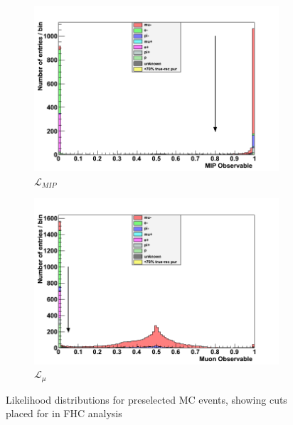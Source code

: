 \begin{figure}[h]
	\begin{subfigure}[t]{0.49\textwidth}	
		\includegraphics[width=\textwidth]{figures/numu/Cuts/numu/Miplik_run12}
		\caption{$\mathcal{L}_{MIP}$}
	\end{subfigure}
	\begin{subfigure}[t]{0.49\textwidth}	
		\includegraphics[width=\textwidth]{figures/numu/Cuts/numu/Mulik_run12}
		\caption{$\mathcal{L}_{\mu}$}
	\end{subfigure}
	\caption{Likelihood distributions for preselected MC events, showing cuts placed for \numu in FHC analysis}
	\label{fig:numu_likelihoods}
\end{figure}

